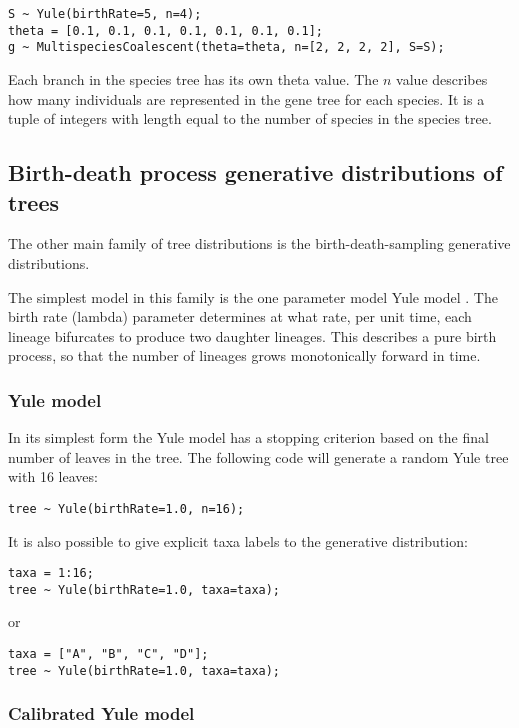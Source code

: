 \documentclass[oneside]{article}
\begin{document}
\begin{verbatim}
S ~ Yule(birthRate=5, n=4);
theta = [0.1, 0.1, 0.1, 0.1, 0.1, 0.1, 0.1];
g ~ MultispeciesCoalescent(theta=theta, n=[2, 2, 2, 2], S=S);
\end{verbatim}

Each branch in the species tree has its own theta value.
The $n$ value describes how many individuals are represented in
the gene tree for each species.
It is a tuple of integers with length equal to the number of species
in the species tree.

\subsection{Birth-death process generative distributions of trees}

The other main family of tree distributions is the birth-death-sampling generative distributions.

The simplest model in this family is the one parameter model Yule model \cite{yule1925ii}. 
The birth rate (lambda) parameter determines at what rate, per unit time, each lineage bifurcates to produce two daughter lineages. 
This describes a pure birth process, so that the number of lineages grows monotonically forward in time. 

\subsubsection{Yule model}

In its simplest form the Yule model has a stopping criterion based on the final number of leaves in the tree. 
The following code will generate a random Yule tree with 16 leaves:

\begin{verbatim}
tree ~ Yule(birthRate=1.0, n=16);
\end{verbatim}

It is also possible to give explicit taxa labels to the generative distribution:

\begin{verbatim}
taxa = 1:16;
tree ~ Yule(birthRate=1.0, taxa=taxa);
\end{verbatim}

or

\begin{verbatim}
taxa = ["A", "B", "C", "D"];
tree ~ Yule(birthRate=1.0, taxa=taxa);
\end{verbatim}

\subsubsection{Calibrated Yule model}
\end{document}
